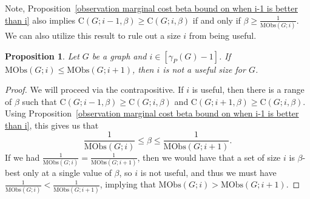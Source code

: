 \documentclass{article}
\newtheorem{proposition}[theorem]{Proposition}
\begin{document}
        Note, Proposition~\ref{observation marginal cost beta bound on when i-1 is better than i} also implies $\mathrm{C}(G;i-1,\beta)\geq\mathrm{C}(G;i,\beta)$ if and only if $\beta\geq\frac{1}{\mathrm{MObs}(G;i)}$.
        We can also utilize this result to rule out a size $i$ from being useful.
        \begin{proposition}\label{proposition marginal obs implies not useful}
            Let $G$ be a graph and $i\in [\gamma_P(G)-1]$.
            If $\mathrm{MObs}(G;i)\leq \mathrm{MObs}(G;i+1)$, then $i$ is not a useful size for $G$.
        \end{proposition}
        \begin{proof}
        	We will proceed via the contrapositive. If $i$ is useful, then there is a range of $\beta$ such that $\mathrm{C}(G;i-1,\beta)\geq\mathrm{C}(G;i,\beta)$ and $\mathrm{C}(G;i+1,\beta)\geq\mathrm{C}(G;i,\beta)$. Using Proposition~\ref{observation marginal cost beta bound on when i-1 is better than i}, this gives us that
        	\[
        	\frac{1}{\mathrm{MObs}(G;i)}\leq \beta\leq \frac{1}{\mathrm{MObs}(G;i+1)}.
        	\]
        	If we had $\frac{1}{\mathrm{MObs}(G;i)}=\frac{1}{\mathrm{MObs}(G;i+1)}$, then we would have that a set of size $i$ is $\beta$-best only at a single value of $\beta$, so $i$ is not useful, and thus we must have $\frac{1}{\mathrm{MObs}(G;i)}< \frac{1}{\mathrm{MObs}(G;i+1)}$, implying that $\mathrm{MObs}(G;i)>\mathrm{MObs}(G;i+1)$.
        \end{proof}
        
\end{document}

